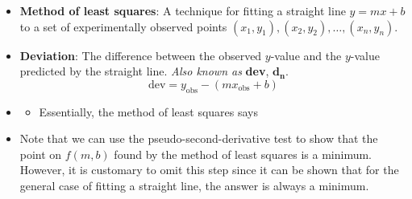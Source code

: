 \documentclass[../main.tex]{subfiles}
\begin{document}
\begin{itemize}
    \item \textbf{Method of least squares}: A technique for fitting a straight line $y=mx+b$ to a set of experimentally observed points $(x_1,y_1),(x_2,y_2),\dots,(x_n,y_n)$.
    \item \textbf{Deviation}: The difference between the observed $y$-value and the $y$-value predicted by the straight line. \emph{Also known as} \textbf{dev}, $\bm{d_n}$.
    \begin{equation*}
        \text{dev} = y_\text{obs}-(mx_\text{obs}+b)
    \end{equation*}
    \item {}
    \begin{itemize}
        \item Essentially, the method of least squares says 
    \end{itemize}
    \item Note that we can use the pseudo-second-derivative test to show that the point on $f(m,b)$ found by the method of least squares is a minimum. However, it is customary to omit this step since it can be shown that for the general case of fitting a straight line, the answer is always a minimum.
\end{itemize}
\end{document}
